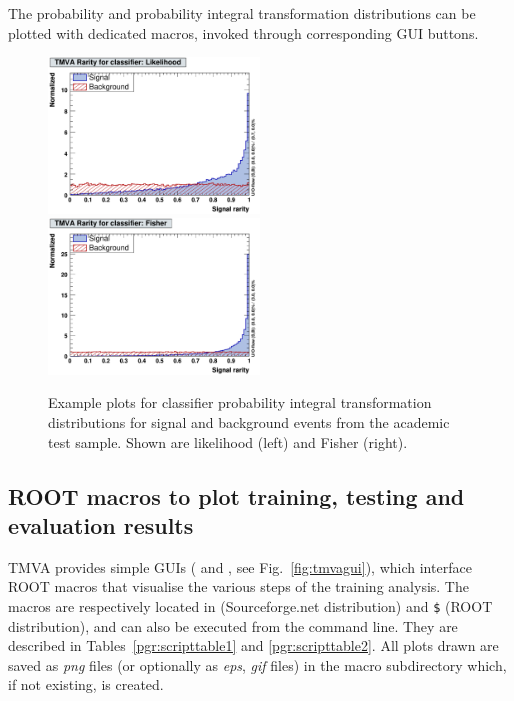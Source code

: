 The probability and probability integral transformation distributions can be plotted with dedicated macros, 
invoked through corresponding GUI buttons.
\begin{figure}[t]
\begin{center}
  \includegraphics[width=0.50\textwidth]{plots/Rarity-Likelihood}
  \hspace{-0.3cm}
  \includegraphics[width=0.50\textwidth]{plots/Rarity-Fisher}
\end{center}
\vspace{-0.5cm}
\caption[.]{Example plots for classifier probability integral transformation distributions for signal and 
            background events from the academic test sample. Shown are
            likelihood (left) and Fisher (right).}
\label{fig:usingtmva:rarity}
\end{figure}

\subsection{ROOT macros to plot training, testing and evaluation 
            results}
\label{sec:rootmacros}

TMVA provides simple GUIs ( and
, see
Fig.~\ref{fig:tmvagui}), which interface ROOT macros that visualise
the various steps of the training analysis. The macros are
respectively located in  (Sourceforge.net
distribution) and {\tt \$} (ROOT
distribution), and can also be executed from the command line. They
are described in Tables~\ref{pgr:scripttable1} and
\ref{pgr:scripttable2}. All plots drawn are saved as {\em png} files
(or optionally as {\em eps}, {\em gif} files) in the macro
subdirectory  which, if not existing, is created.

